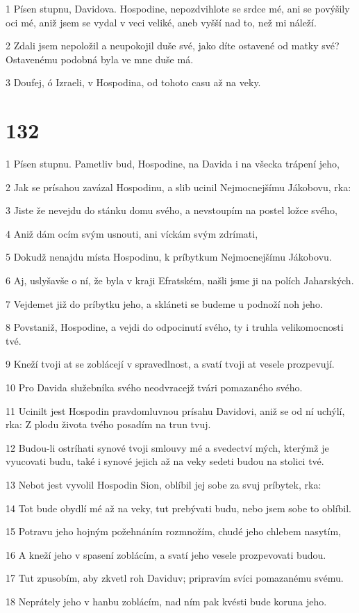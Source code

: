 \par 1 Písen stupnu, Davidova. Hospodine, nepozdvihlote se srdce mé, ani se povýšily oci mé, aniž jsem se vydal v veci veliké, aneb vyšší nad to, než mi náleží.
\par 2 Zdali jsem nepoložil a neupokojil duše své, jako díte ostavené od matky své? Ostavenému podobná byla ve mne duše má.
\par 3 Doufej, ó Izraeli, v Hospodina, od tohoto casu až na veky.

\chapter{132}

\par 1 Písen stupnu. Pametliv bud, Hospodine, na Davida i na všecka trápení jeho,
\par 2 Jak se prísahou zavázal Hospodinu, a slib ucinil Nejmocnejšímu Jákobovu, rka:
\par 3 Jiste že nevejdu do stánku domu svého, a nevstoupím na postel ložce svého,
\par 4 Aniž dám ocím svým usnouti, ani víckám svým zdrímati,
\par 5 Dokudž nenajdu místa Hospodinu, k príbytkum Nejmocnejšímu Jákobovu.
\par 6 Aj, uslyšavše o ní, že byla v kraji Efratském, našli jsme ji na polích Jaharských.
\par 7 Vejdemet již do príbytku jeho, a skláneti se budeme u podnoží noh jeho.
\par 8 Povstaniž, Hospodine, a vejdi do odpocinutí svého, ty i truhla velikomocnosti tvé.
\par 9 Kneží tvoji at se zoblácejí v spravedlnost, a svatí tvoji at vesele prozpevují.
\par 10 Pro Davida služebníka svého neodvracejž tvári pomazaného svého.
\par 11 Ucinilt jest Hospodin pravdomluvnou prísahu Davidovi, aniž se od ní uchýlí, rka: Z plodu života tvého posadím na trun tvuj.
\par 12 Budou-li ostríhati synové tvoji smlouvy mé a svedectví mých, kterýmž je vyucovati budu, také i synové jejich až na veky sedeti budou na stolici tvé.
\par 13 Nebot jest vyvolil Hospodin Sion, oblíbil jej sobe za svuj príbytek, rka:
\par 14 Tot bude obydlí mé až na veky, tut prebývati budu, nebo jsem sobe to oblíbil.
\par 15 Potravu jeho hojným požehnáním rozmnožím, chudé jeho chlebem nasytím,
\par 16 A kneží jeho v spasení zoblácím, a svatí jeho vesele prozpevovati budou.
\par 17 Tut zpusobím, aby zkvetl roh Daviduv; pripravím svíci pomazanému svému.
\par 18 Neprátely jeho v hanbu zoblácím, nad ním pak kvésti bude koruna jeho.

